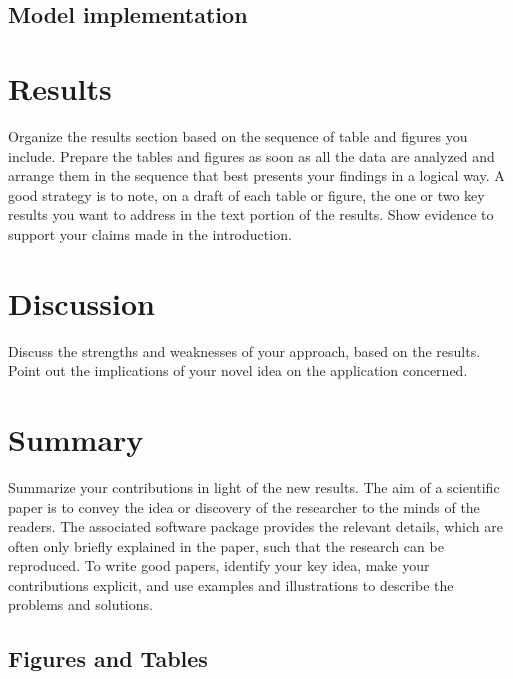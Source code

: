 \documentclass[10pt,conference,compsocconf]{IEEEtran}
\begin{document}
  \subsection{
  Model implementation
  }
\section{Results}\label{sec: results}
Organize the results section based on the sequence of table and
figures you include. Prepare the tables and figures as soon as all
the data are analyzed and arrange them in the sequence that best
presents your findings in a logical way. A good strategy is to note,
on a draft of each table or figure, the one or two key results you
want to address in the text portion of the results.
Show evidence to support your claims made in the
  introduction.
\section{Discussion}\label{sec: discussion}
Discuss the strengths and weaknesses of your
  approach, based on the results. Point out the implications of your
  novel idea on the application concerned.
\section{Summary}\label{sec: summary}
Summarize your contributions in light of the new
  results.
The aim of a scientific paper is to convey the idea or discovery of
the researcher to the minds of the readers. The associated software
package provides the relevant details, which are often only briefly
explained in the paper, such that the research can be reproduced.
To write good papers, identify your key idea, make your contributions
explicit, and use examples and illustrations to describe the problems
and solutions.

\subsection{Figures and Tables}
\end{document}
